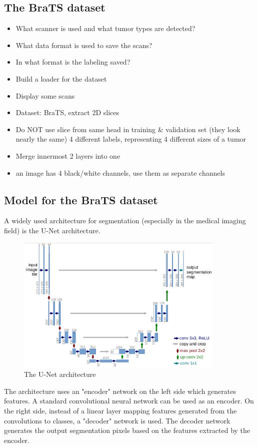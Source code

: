 \subsection{The BraTS dataset}
\begin{itemize}
    \item What scanner is used and what tumor types are detected?
    \item What data format is used to save the scans?
    \item In what format is the labeling saved?
    \item Build a loader for the dataset
    \item Display some scans
    \item Dataset: BraTS, extract 2D slices
    \item Do NOT use slice from same head in training \& validation set (they look nearly the same) 4 different labels, representing 4 different sizes of a tumor
    \item Merge innermost 2 layers into one
    \item an image has 4 black/white channels, use them as separate channels
\end{itemize}

\subsection{Model for the BraTS dataset}
A widely used architecture for segmentation (especially in the medical imaging field) is the U-Net\cite{ronneberger2015u} architecture.

\begin{figure}[H]
\centering
\caption{The U-Net architecture}
\includegraphics[width=10cm]{images/unet.png}
\end{figure}

The architecture uses an "encoder" network on the left side which generates features. A standard convolutional neural network can be used as an encoder. On the right side, instead of a linear layer mapping features generated from the convolutions to classes, a "decoder" network is used. The decoder network generates the output segmentation pixels based on the features extracted by the encoder. 

